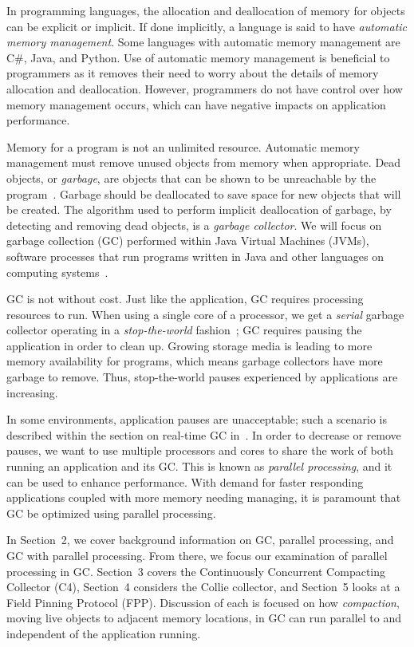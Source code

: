\documentclass{sig-alternate}
\begin{document}
In programming languages, the allocation and deallocation
of memory for objects can be explicit or implicit. If done implicitly,
a language is said to have \emph{automatic memory management}. Some languages 
with automatic memory management are C\#, Java, and Python.
Use of automatic memory management is beneficial to programmers as it 
removes their need to worry about the details of memory allocation and deallocation. 
However, programmers do not have control over how memory management occurs,
which can have negative impacts on application performance.

Memory for a program is not an unlimited resource. Automatic memory management
must remove unused objects from memory when appropriate.
Dead objects, or \emph{garbage}, are objects that can be shown
to be unreachable by the program~\cite{Lindblom:2011}. Garbage should be deallocated to 
save space for new objects that will be created. The algorithm used to perform implicit
deallocation of garbage, by detecting and removing dead objects, 
is a \emph{garbage collector}.
We will focus on
garbage collection (GC) performed within Java Virtual Machines 
(JVMs), software processes that run programs written in Java and other languages 
on computing systems~\cite{Lindblom:2011}.

GC is not without cost.
Just like the application, GC requires processing resources to run. When using a single core of a processor, 
we get a \emph{serial} garbage collector operating in a 
\emph{stop-the-world} fashion~\cite{Lindblom:2011}; GC requires
pausing the application in order to clean up. 
Growing storage media is leading to more memory
availability for programs, which means garbage collectors
have more garbage to remove. Thus, stop-the-world pauses
experienced by applications are increasing.

In some environments,
application pauses are unacceptable; such a scenario is described within the section on 
real-time GC in~\cite{Lindblom:2011}. In order to decrease or remove 
pauses, we want to use multiple
processors and cores to share the work of both running an application and its GC.
This is known as \emph{parallel processing}, and it can be used
to enhance performance. With
demand for faster responding applications coupled with more memory needing managing,
it is paramount that GC be optimized using parallel processing. 

In Section~2, we cover background information on GC, parallel processing,
and GC with parallel processing.
From there, we focus our examination of parallel processing in GC.
Section~3 covers the Continuously Concurrent Compacting Collector (C4), 
Section~4 considers the Collie collector, and Section~5 looks at a Field Pinning Protocol (FPP).
Discussion of each is focused on how \emph{compaction}, moving live objects to 
adjacent memory locations, in GC can run parallel to
and independent of the application running. 
\end{document}
